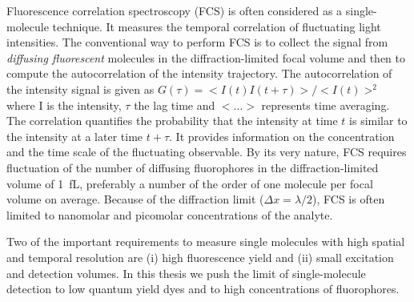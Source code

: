 Fluorescence correlation spectroscopy (FCS) is often considered as a single-molecule technique. It measures the temporal correlation of fluctuating light intensities.\cite{magde1972thermodynamic,elson1974fluorescence,krichevsky2002fluorescence}
The conventional way to perform FCS is to collect the signal from \textit{diffusing fluorescent} molecules in the diffraction-limited focal volume and then to compute the autocorrelation of the intensity trajectory.
The autocorrelation of the intensity signal is given as $G(\tau)=<I(t)I(t+\tau)>/<I(t)>^2$ where I is the intensity, $\tau$ the lag time and $<...>$ represents time averaging.
The correlation quantifies the probability that the intensity at time $t$ is similar to the intensity at a later time $t+\tau$.
It provides information on the concentration and the time scale of the fluctuating observable.
By its very nature, FCS requires fluctuation of the number of diffusing fluorophores in the diffraction-limited volume of \SI{1}{fL}, preferably a number of the order of one molecule per focal volume on average.
Because of the diffraction limit ($\Delta{x}={\lambda}/2$), FCS is often limited to nanomolar and picomolar concentrations of the analyte.

Two of the important requirements to measure single molecules with high spatial and temporal resolution are (i) high fluorescence yield and (ii) small excitation and detection volumes.
In this thesis we push the limit of single-molecule detection to low quantum yield dyes and to high concentrations of fluorophores.

